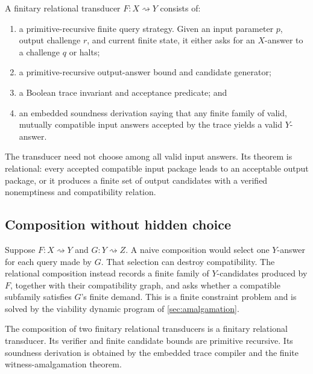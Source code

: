 \begin{definition}
A finitary relational transducer \(F:X\rightsquigarrow Y\) consists of:
\begin{enumerate}
\item a primitive-recursive finite query strategy.  Given an input parameter
      \(p\), output challenge \(r\), and current finite state, it either asks
      for an \(X\)-answer to a challenge \(q\) or halts;
\item a primitive-recursive output-answer bound and candidate generator;
\item a Boolean trace invariant and acceptance predicate; and
\item an embedded soundness derivation saying that any finite family of valid,
      mutually compatible input answers accepted by the trace yields a valid
      \(Y\)-answer.
\end{enumerate}
\end{definition}

The transducer need not choose among all valid input answers.  Its theorem is
relational: every accepted compatible input package leads to an acceptable
output package, or it produces a finite set of output candidates with a
verified nonemptiness and compatibility relation.

\subsection{Composition without hidden choice}

Suppose \(F:X\rightsquigarrow Y\) and \(G:Y\rightsquigarrow Z\).  A naive
composition would select one \(Y\)-answer for each query made by \(G\).  That
selection can destroy compatibility.  The relational composition instead
records a finite family of \(Y\)-candidates produced by \(F\), together with
their compatibility graph, and asks whether a compatible subfamily satisfies
\(G\)'s finite demand.  This is a finite constraint problem and is solved by
the viability dynamic program of \cref{sec:amalgamation}.

\begin{theorem}
\label{thm:rel-composition}
The composition of two finitary relational transducers is a finitary
relational transducer.  Its verifier and finite candidate bounds are primitive
recursive.  Its soundness derivation is obtained by the embedded trace
compiler and the finite witness-amalgamation theorem.
\end{theorem}

